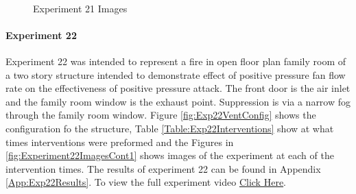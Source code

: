 \documentclass{article}
\begin{document}
\begin{figure}[H]
	\ContinuedFloat 
	\centering 
	 \ 
	\caption{Experiment 21 Images}
	\label{fig:Experiment21ImagesCont3} 
\end{figure}

\paragraph{Experiment 22}\mbox{}

Experiment 22 was intended to represent a fire in open floor plan family room of a two story structure intended to demonstrate effect of positive pressure fan flow rate on the effectiveness of positive pressure attack. The front door is the air inlet and the family room window is the exhaust point. Suppression is via a narrow fog through the family room window. Figure \ref{fig:Exp22VentConfig} shows the configuration fo the structure, Table \ref{Table:Exp22Interventions} show at what times interventions were preformed and the Figures in \ref{fig:Experiment22ImagesCont1} shows images of the experiment at each of the intervention times. The results of experiment 22 can be found in Appendix \ref{App:Exp22Results}. To view the full experiment video \href{https://youtu.be/so4YGhws3SY}{Click Here}.
\end{document}
